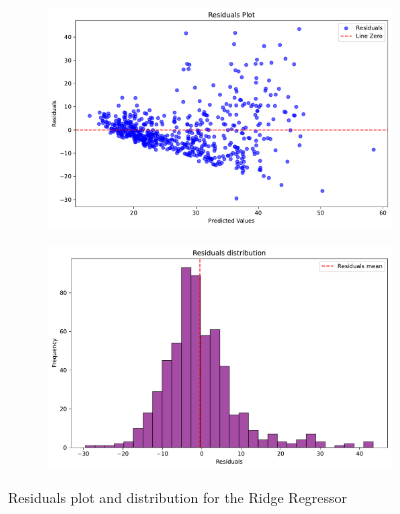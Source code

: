 \begin{figure}
    \centering
    \begin{subfigure}{0.23\textwidth}
        \centering
        \includegraphics[width=\textwidth]{img/residuals_RI_1.pdf}
    \end{subfigure}
    \begin{subfigure}{0.23\textwidth}
        \centering
        \includegraphics[width=\textwidth]{img/residuals_RI_2.pdf} 
    \end{subfigure}
    \caption{Residuals plot and distribution for the Ridge Regressor}
    \label{fig:res_Ridge}
\end{figure}

